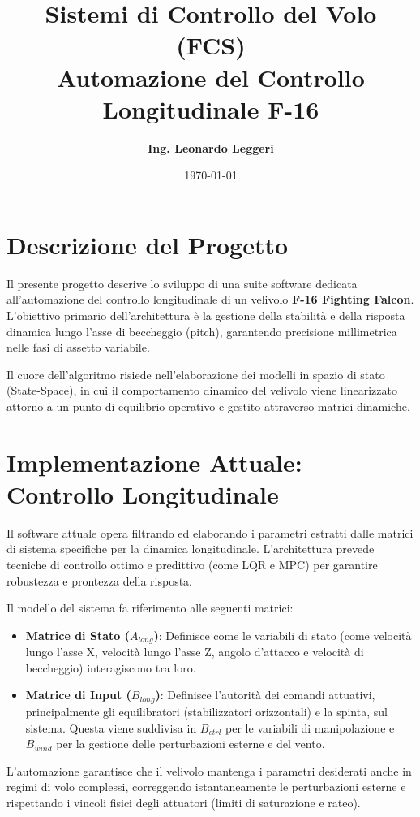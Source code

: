 \documentclass[12pt,a4paper]{article}
\title{\textbf{Sistemi di Controllo del Volo (FCS)\\ Automazione del Controllo Longitudinale F-16}}
\author{\textbf{Ing. Leonardo Leggeri}}
\date{\today}
\begin{document}
\maketitle

\section{Descrizione del Progetto}
Il presente progetto descrive lo sviluppo di una suite software dedicata all'automazione del controllo longitudinale di un velivolo \textbf{F-16 Fighting Falcon}. L'obiettivo primario dell'architettura è la gestione della stabilità e della risposta dinamica lungo l'asse di beccheggio (pitch), garantendo precisione millimetrica nelle fasi di assetto variabile.

Il cuore dell'algoritmo risiede nell'elaborazione dei modelli in spazio di stato (State-Space), in cui il comportamento dinamico del velivolo viene linearizzato attorno a un punto di equilibrio operativo e gestito attraverso matrici dinamiche.

\section{Implementazione Attuale: Controllo Longitudinale}
Il software attuale opera filtrando ed elaborando i parametri estratti dalle matrici di sistema specifiche per la dinamica longitudinale. L'architettura prevede tecniche di controllo ottimo e predittivo (come LQR e MPC) per garantire robustezza e prontezza della risposta.

Il modello del sistema fa riferimento alle seguenti matrici:
\begin{itemize}
    \item \textbf{Matrice di Stato ($A_{long}$)}: Definisce come le variabili di stato (come velocità lungo l'asse X, velocità lungo l'asse Z, angolo d'attacco e velocità di beccheggio) interagiscono tra loro.
    \item \textbf{Matrice di Input ($B_{long}$)}: Definisce l'autorità dei comandi attuativi, principalmente gli equilibratori (stabilizzatori orizzontali) e la spinta, sul sistema. Questa viene suddivisa in $B_{ctrl}$ per le variabili di manipolazione e $B_{wind}$ per la gestione delle perturbazioni esterne e del vento.
\end{itemize}

L'automazione garantisce che il velivolo mantenga i parametri desiderati anche in regimi di volo complessi, correggendo istantaneamente le perturbazioni esterne e rispettando i vincoli fisici degli attuatori (limiti di saturazione e rateo).
\end{document}
